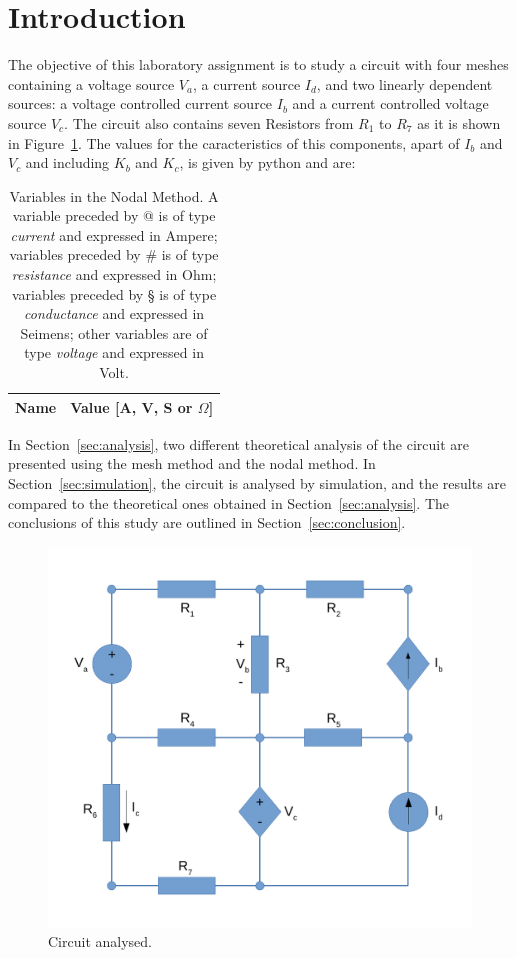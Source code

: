 \section{Introduction}
\label{sec:introduction}

The objective of this laboratory assignment is to study a circuit with four meshes containing a
voltage source $V_a$, a current source $I_d$, and two linearly dependent sources: a voltage controlled current source $I_b$ and a current controlled voltage source $V_c$. The circuit also contains seven Resistors from $R_1$ to $R_7$ as it is shown in Figure~\ref{fig:Circuit_Base}.
The values for the caracteristics of this components, apart of $I_b$ and $V_c$ and including $K_b$ and $K_c$, is given by python and are:

\begin{table}[h]
  \centering
  \begin{tabular}{|l|r|}
    \hline    
    {\bf Name} & {\bf Value [A, V, S or $\Omega$]} \\ \hline
    
  \end{tabular}
  \caption{Variables in the Nodal Method. A variable preceded by @ is of type {\em current} and expressed in Ampere; variables preceded by \# is of type {\em resistance} and expressed in Ohm; variables preceded by § is of type {\em conductance} and expressed in Seimens; other variables are of type {\em voltage} and expressed in Volt.}
  \label{tab:Enunciado}
\end{table}

In Section~\ref{sec:analysis}, two different theoretical analysis of the circuit are
presented using the mesh method and the nodal method. In Section~\ref{sec:simulation}, the circuit is analysed by
simulation, and the results are compared to the theoretical ones obtained in
Section~\ref{sec:analysis}. The conclusions of this study are outlined in
Section~\ref{sec:conclusion}.

\begin{figure}[h] \centering
\includegraphics[width=0.5\linewidth]{Circuit.pdf}
\caption{Circuit analysed.}
\label{fig:Circuit_Base}
\end{figure}

